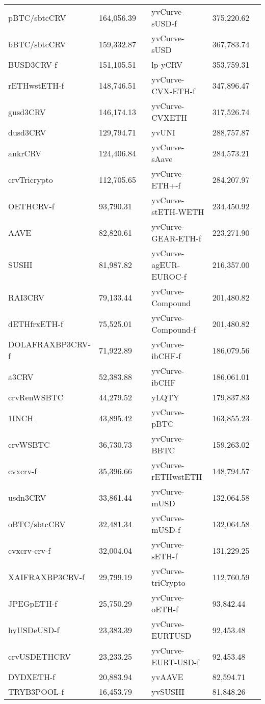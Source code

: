 \begin{longtable}{@{}p{0.25\linewidth}p{0.25\linewidth}p{0.25\linewidth}p{0.25\linewidth}@{}}
pBTC/sbtcCRV & 164,056.39 & yvCurve-sUSD-f & 375,220.62 \\
bBTC/sbtcCRV & 159,332.87 & yvCurve-sUSD & 367,783.74 \\
BUSD3CRV-f & 151,105.51 & lp-yCRV & 353,759.31 \\
rETHwstETH-f & 148,746.51 & yvCurve-CVX-ETH-f & 347,896.47 \\
gusd3CRV & 146,174.13 & yvCurve-CVXETH & 317,526.74 \\
dusd3CRV & 129,794.71 & yvUNI & 288,757.87 \\
ankrCRV & 124,406.84 & yvCurve-sAave & 284,573.21 \\
crvTricrypto & 112,705.65 & yvCurve-ETH+-f & 284,207.97 \\
OETHCRV-f & 93,790.31 & yvCurve-stETH-WETH & 234,450.92 \\
AAVE & 82,820.61 & yvCurve-GEAR-ETH-f & 223,271.90 \\
SUSHI & 81,987.82 & yvCurve-agEUR-EUROC-f & 216,357.00 \\
RAI3CRV & 79,133.44 & yvCurve-Compound & 201,480.82 \\
dETHfrxETH-f & 75,525.01 & yvCurve-Compound-f & 201,480.82 \\
DOLAFRAXBP3CRV-f & 71,922.89 & yvCurve-ibCHF-f & 186,079.56 \\
a3CRV & 52,383.88 & yvCurve-ibCHF & 186,061.01 \\
crvRenWSBTC & 44,279.52 & yLQTY & 179,837.83 \\
1INCH & 43,895.42 & yvCurve-pBTC & 163,855.23 \\
crvWSBTC & 36,730.73 & yvCurve-BBTC & 159,263.02 \\
cvxcrv-f & 35,396.66 & yvCurve-rETHwstETH & 148,794.57 \\
usdn3CRV & 33,861.44 & yvCurve-mUSD & 132,064.58 \\
oBTC/sbtcCRV & 32,481.34 & yvCurve-mUSD-f & 132,064.58 \\
cvxcrv-crv-f & 32,004.04 & yvCurve-sETH-f & 131,229.25 \\
XAIFRAXBP3CRV-f & 29,799.19 & yvCurve-triCrypto & 112,760.59 \\
JPEGpETH-f & 25,750.29 & yvCurve-oETH-f & 93,842.44 \\
hyUSDeUSD-f & 23,383.39 & yvCurve-EURTUSD & 92,453.48 \\
crvUSDETHCRV & 23,233.25 & yvCurve-EURT-USD-f & 92,453.48 \\
DYDXETH-f & 20,883.94 & yvAAVE & 82,594.71 \\
TRYB3POOL-f & 16,453.79 & yvSUSHI & 81,848.26 \\

\end{longtable}
